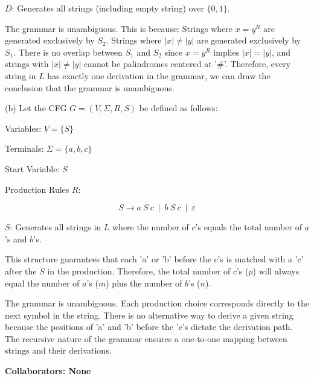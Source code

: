 \documentclass[12 pt]{article}
\begin{document}
\( D \): Generates all strings (including empty string) over \( \{0, 1\} \).


The grammar is unambiguous. This is because: Strings where \( x = y^R \) are generated exclusively by \( S_2 \). Strings where \( |x| \ne |y| \) are generated exclusively by \( S_1 \). There is no overlap between \( S_1 \) and \( S_2 \) since \( x = y^R \) implies \( |x| = |y| \), and strings with \( |x| \ne |y| \) cannot be palindromes centered at '\#'. Therefore, every string in \( L \) has exactly one derivation in the grammar, we can draw the conclusion that the grammar is unambiguous.


\vspace{1cm}

(b) Let the CFG \( G = (V, \Sigma, R, S) \) be defined as follows:

Variables: \( V = \{ S \} \)


Terminals: \( \Sigma = \{ a, b, c \} \)


Start Variable: \( S \)


Production Rules \( R \):

  \[
  S \rightarrow a\ S\ c\ \mid\ b\ S\ c\ \mid\ \varepsilon
  \]


\( S \): Generates all strings in \( L \) where the number of \( c \)'s equals the total number of \( a \)'s and \( b \)'s. 

This structure guarantees that each 'a' or 'b' before the \( c \)'s is matched with a 'c' after the \( S \) in the production. Therefore, the total number of \( c \)'s (\( p \)) will always equal the number of \( a \)'s (\( m \)) plus the number of \( b \)'s (\( n \)).


The grammar is unambiguous. Each production choice corresponds directly to the next symbol in the string. There is no alternative way to derive a given string because the positions of 'a' and 'b' before the 'c's dictate the derivation path. The recursive nature of the grammar ensures a one-to-one mapping between strings and their derivations.

\vspace{1cm}

\noindent\textbf{Collaborators: None}
\end{document}

